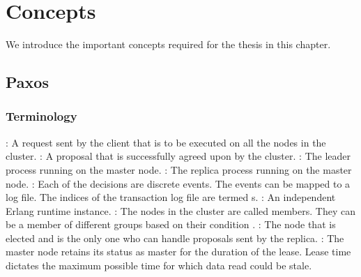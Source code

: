 \chapter{Concepts}
\label{chapter:concepts}

We introduce the important concepts required for the thesis in this chapter.

\section{Paxos}
\label{section:concepts.paxos}

\subsection{Terminology}

\begin{itemize}
    : A request sent by the client that is to be executed on all
    the nodes in the cluster.
    : A proposal that is successfully agreed upon by the
    cluster.
    : The leader process running on the master node.
    : The replica process running on the master node.
    : Each of the decisions are discrete events. The events can be
    mapped to a log file. The indices of the transaction log file are termed
    s.
    : An independent Erlang runtime instance.
    : The nodes in the cluster are called members. They can be
    a member of different groups based on their condition%
    .
    : The node that is elected and is the only one who can handle
    proposals sent by the replica.
    : The master node retains its status as master for the duration
    of the lease. Lease time dictates the maximum possible time for which data
    read could be stale.
\end{itemize}

